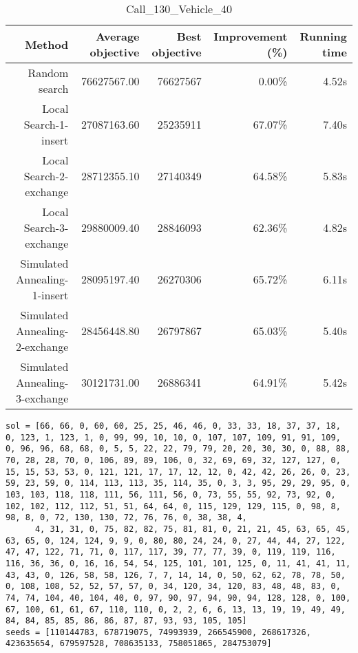 \begin{table}[ht]
\centering
\caption{Call\_130\_Vehicle\_40}
\label{tab:call130vehicle40}
\begin{tabular}{|r|r|r|r|r|}
Method & Average objective & Best objective & Improvement (\%) & Running time \\
\hline
Random search & 76627567.00 & 76627567 & 0.00\% & 4.52s\\
Local Search-1-insert & 27087163.60 & 25235911 & 67.07\% & 7.40s\\
Local Search-2-exchange & 28712355.10 & 27140349 & 64.58\% & 5.83s\\
Local Search-3-exchange & 29880009.40 & 28846093 & 62.36\% & 4.82s\\
Simulated Annealing-1-insert & 28095197.40 & 26270306 & 65.72\% & 6.11s\\
Simulated Annealing-2-exchange & 28456448.80 & 26797867 & 65.03\% & 5.40s\\
Simulated Annealing-3-exchange & 30121731.00 & 26886341 & 64.91\% & 5.42s\\
\end{tabular}%
\end{table}
\begin{lstlisting}[label={lst:call130vehicle40},caption=Optimal solution call\_130\_vehicle\_40]
sol = [66, 66, 0, 60, 60, 25, 25, 46, 46, 0, 33, 33, 18, 37, 37, 18, 0, 123, 1, 123, 1, 0, 99, 99, 10, 10, 0, 107, 107, 109, 91, 91, 109, 0, 96, 96, 68, 68, 0, 5, 5, 22, 22, 79, 79, 20, 20, 30, 30, 0, 88, 88, 70, 28, 28, 70, 0, 106, 89, 89, 106, 0, 32, 69, 69, 32, 127, 127, 0, 15, 15, 53, 53, 0, 121, 121, 17, 17, 12, 12, 0, 42, 42, 26, 26, 0, 23, 59, 23, 59, 0, 114, 113, 113, 35, 114, 35, 0, 3, 3, 95, 29, 29, 95, 0, 103, 103, 118, 118, 111, 56, 111, 56, 0, 73, 55, 55, 92, 73, 92, 0, 102, 102, 112, 112, 51, 51, 64, 64, 0, 115, 129, 129, 115, 0, 98, 8, 98, 8, 0, 72, 130, 130, 72, 76, 76, 0, 38, 38, 4,
      4, 31, 31, 0, 75, 82, 82, 75, 81, 81, 0, 21, 21, 45, 63, 65, 45, 63, 65, 0, 124, 124, 9, 9, 0, 80, 80, 24, 24, 0, 27, 44, 44, 27, 122, 47, 47, 122, 71, 71, 0, 117, 117, 39, 77, 77, 39, 0, 119, 119, 116, 116, 36, 36, 0, 16, 16, 54, 54, 125, 101, 101, 125, 0, 11, 41, 41, 11, 43, 43, 0, 126, 58, 58, 126, 7, 7, 14, 14, 0, 50, 62, 62, 78, 78, 50, 0, 108, 108, 52, 52, 57, 57, 0, 34, 120, 34, 120, 83, 48, 48, 83, 0, 74, 74, 104, 40, 104, 40, 0, 97, 90, 97, 94, 90, 94, 128, 128, 0, 100, 67, 100, 61, 61, 67, 110, 110, 0, 2, 2, 6, 6, 13, 13, 19, 19, 49, 49, 84, 84, 85, 85, 86, 86, 87, 87, 93, 93, 105, 105]
seeds = [110144783, 678719075, 74993939, 266545900, 268617326, 423635654, 679597528, 708635133, 758051865, 284753079]
\end{lstlisting}%
\clearpage


